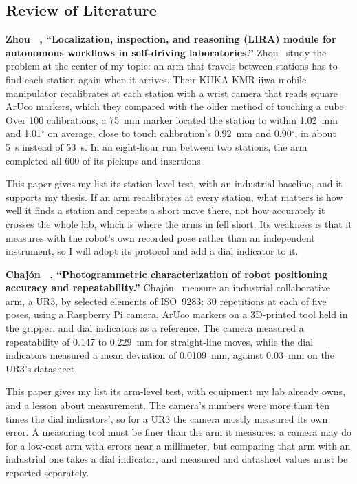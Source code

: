 \subsection{Review of Literature}

\textbf{Zhou \etal\ \cite{zhou2025}, ``Localization, inspection, and reasoning (LIRA) module for
autonomous workflows in self-driving laboratories.''} Zhou \etal\ study the problem at the
center of my topic: an arm that travels between stations has to find each station again when it
arrives. Their KUKA KMR iiwa mobile manipulator recalibrates at each station with a wrist camera
that reads square ArUco markers, which they compared with the older method of touching a cube.
Over 100 calibrations, a 75~mm marker located the station to within 1.02~mm and 1.01$^{\circ}$
on average, close to touch calibration's 0.92~mm and 0.90$^{\circ}$, in about 5~s instead of
53~s. In an eight-hour run between two stations, the arm completed all 600 of its pickups and
insertions.

This paper gives my list its station-level test, with an industrial baseline, and it supports
my thesis. If an arm recalibrates at every station, what matters is how well it finds a station
and repeats a short move there, not how accurately it crosses the whole lab, which is where the
arms in \cite{wattoo2024} fell short. Its weakness is that it measures with the robot's own
recorded pose rather than an independent instrument, so I will adopt its protocol and add a
dial indicator to it.

\textbf{Chaj\'{o}n \etal\ \cite{chajon2026}, ``Photogrammetric characterization of robot
positioning accuracy and repeatability.''} Chaj\'{o}n \etal\ measure an industrial
collaborative arm, a UR3, by selected elements of ISO~9283: 30 repetitions at each of five
poses, using a Raspberry Pi camera, ArUco markers on a 3D-printed tool held in the gripper, and
dial indicators as a reference. The camera measured a repeatability of 0.147 to 0.229~mm for
straight-line moves, while the dial indicators measured a mean deviation of 0.0109~mm, against 0.03~mm on the UR3's
datasheet.

This paper gives my list its arm-level test, with equipment my lab already owns, and a lesson
about measurement. The camera's numbers were more than ten times the dial indicators', so for a
UR3 the camera mostly measured its own error. A measuring tool must be finer than the arm it
measures: a camera may do for a low-cost arm with errors near a millimeter, but comparing that
arm with an industrial one takes a dial indicator, and measured and datasheet values must be
reported separately.

